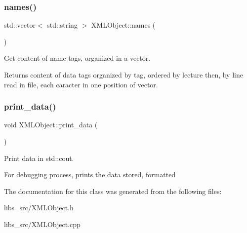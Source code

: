 \subsubsection{\texorpdfstring{names()}{names()}}
{\footnotesize\ttfamily std\+::vector$<$ std\+::string $>$ X\+M\+L\+Object\+::names (\begin{DoxyParamCaption}{ }\end{DoxyParamCaption})}



Get content of name tags, organized in a vector. 

\begin{DoxyReturn}{Returns}
content of data tags organized by tag, ordered by lecture then, by line read in file, each caracter in one position of vector. 
\end{DoxyReturn}
\mbox{\label{class_x_m_l_object_ac1819fca641e9dd77c0523b840244819}} 
\subsubsection{\texorpdfstring{print\+\_\+data()}{print\_data()}}
{\footnotesize\ttfamily void X\+M\+L\+Object\+::print\+\_\+data (\begin{DoxyParamCaption}{ }\end{DoxyParamCaption})}



Print data in std\+::cout. 

For debugging process, prints the data stored, formatted 

The documentation for this class was generated from the following files\+:\begin{DoxyCompactItemize}
\item 
libs\+\_\+src/X\+M\+L\+Object.\+h\item 
libs\+\_\+src/X\+M\+L\+Object.\+cpp\end{DoxyCompactItemize}
